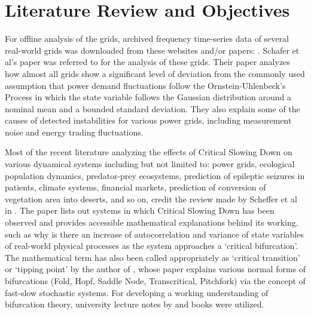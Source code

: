 \section[Literature Review and Objectives]{Literature Review and Objectives}
\label{sec:litt}

For offline analysis of the grids, archived frequency time-series data of several real-world grids was downloaded from these websites and/or papers: \cite{lrydin01, lrydinGithub, tokyo2017, tokyo2020, nordic2018, nordic2019, ce2019, ce2020,  ukNationalGridESOData}. Schafer et al's paper \cite{schafer01} was referred to for the analysis of these grids. Their paper  analyzes how almost all grids show a significant level of deviation from the commonly used assumption that power demand fluctuations follow the Ornstein-Uhlenbeck's Process in which the state variable follows the Gaussian distribution around a nominal mean and a bounded standard deviation. They also explain some of the causes of detected instabilities for various power grids, including measurement noise and energy trading fluctuations.

Most of the recent literature analyzing the effects of Critical Slowing Down on various dynamical systems including but not limited to: power grids, ecological population dynamics, predator-prey ecosystems, prediction of epileptic seizures in patients, climate systems, financial markets, prediction of conversion of vegetation area into deserts, and so on, credit the review made by Scheffer et al in \cite{schefferEarlyWarningSignalsForCriticalTransitions}. The paper lists out systems in which Critical Slowing Down has been observed and provides accessible mathematical explanations behind its working, such as why is there an increase of autocorrelation and variance of state variables of real-world physical processes as the system approaches a `critical bifurcation'. The mathematical term has also been called appropriately as `critical transition' or `tipping point' by the author of \cite{kuehnMathematicalFrameworkForCriticalTransitions}, whose paper explains various normal forms of bifurcations (Fold, Hopf, Saddle Node, Transcritical, Pitchfork) via the concept of fast-slow stochastic systems. For developing a working understanding of bifurcation theory, university lecture notes by \cite{nathanKutzNotesOnBifurcationTheoryAndNormalForms} and books \cite{chenBifurcationsAndChaosInEngineering, mohlerDyanmicsAndControlPartOne} were utilized.  

